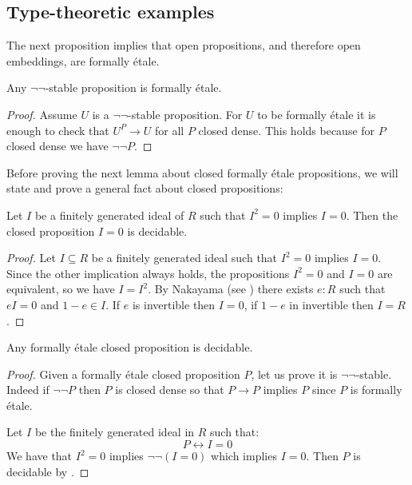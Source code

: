 \subsection{Type-theoretic examples}

The next proposition implies that open propositions, and therefore open embeddings, are formally étale.

\begin{lemma}\label{not-not-stable-prop-etale}
  Any $\neg\neg$-stable proposition is formally étale.
\end{lemma}

\begin{proof}
  Assume $U$ is a $\neg\neg$-stable proposition. For $U$ to be formally étale it is enough to check that $U^P\to U$ for all $P$ closed dense. This holds because for $P$ closed dense we have $\neg\neg P$.
  \end{proof}

Before proving the next lemma about closed formally étale propositions,
we will state and prove a general fact about closed propositions:

\begin{lemma}
  \label{square-zero-implies-zero-decidable}
  Let $I$ be a finitely generated ideal of $R$ such that $I^2=0$ implies $I=0$.
  Then the closed proposition $I=0$ is decidable.
\end{lemma}

\begin{proof}
  Let $I\subseteq R$ be a finitely generated ideal such that $I^2=0$ implies $I=0$.
  Since the other implication always holds, the propositions $I^2=0$ and $I=0$ are equivalent, so we have $I=I^2$.
  By Nakayama (see \cite[Lemma II.4.6]{lombardi-quitte}) there exists $e:R$ such that $eI = 0$ and $1-e\in I$.
  If $e$ is invertible then $I=0$, if $1-e$ in invertible then $I=R$.
\end{proof}

\begin{lemma}\label{closed-and-etale-decidable}
Any formally étale closed proposition is decidable.
\end{lemma} 

\begin{proof}
Given a formally étale closed proposition $P$, let us prove it is $\neg\neg$-stable. Indeed if $\neg\neg P$ then $P$ is closed dense so that $P\to P$ implies $P$ since $P$ is formally étale. 

Let $I$ be the finitely generated ideal in $R$ such that:
\[P\leftrightarrow I=0\]
We have that $I^2=0$ implies $\neg\neg (I=0)$ which implies $I=0$.
Then $P$ is decidable by . 
\end{proof}

